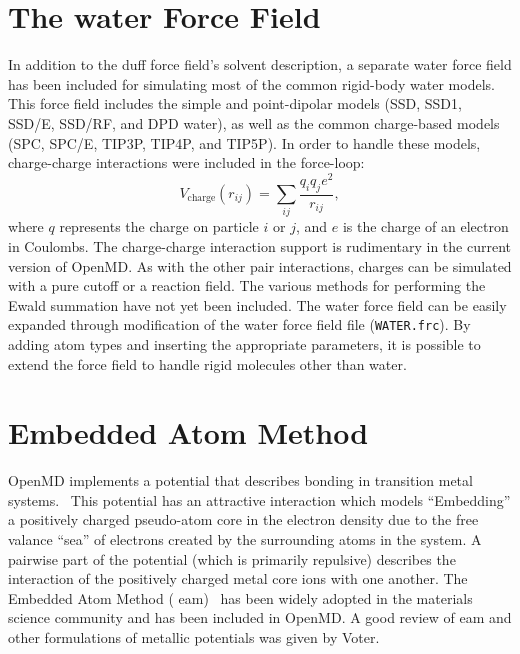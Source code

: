 \documentclass[]{book}
\begin{document}
\section{\label{section:WATER}The {\sc water} Force Field}

In addition to the {\sc duff} force field's solvent description, a
separate {\sc water} force field has been included for simulating most
of the common rigid-body water models. This force field includes the
simple and point-dipolar models (SSD, SSD1, SSD/E, SSD/RF, and DPD
water), as well as the common charge-based models (SPC, SPC/E, TIP3P,
TIP4P, and
TIP5P).\cite{liu96:new_model,Ichiye03,fennell04,Marrink01,Berendsen81,Berendsen87,Jorgensen83,Mahoney00}
In order to handle these models, charge-charge interactions were
included in the force-loop:
\begin{equation}
V_{\text{charge}}(r_{ij}) = \sum_{ij}\frac{q_iq_je^2}{r_{ij}}, 
\end{equation}
where $q$ represents the charge on particle $i$ or $j$, and $e$ is the
charge of an electron in Coulombs. The charge-charge interaction
support is rudimentary in the current version of {\sc OpenMD}.  As with
the other pair interactions, charges can be simulated with a pure
cutoff or a reaction field.  The various methods for performing the
Ewald summation have not yet been included.  The {\sc water} force
field can be easily expanded through modification of the {\sc water}
force field file ({\tt WATER.frc}). By adding atom types and inserting
the appropriate parameters, it is possible to extend the force field
to handle rigid molecules other than water.

\section{\label{section:eam}Embedded Atom Method}

{\sc OpenMD} implements a potential that describes bonding in
transition metal
systems.~\cite{Finnis84,Ercolessi88,Chen90,Qi99,Ercolessi02} This
potential has an attractive interaction which models ``Embedding'' a
positively charged pseudo-atom core in the electron density due to the
free valance ``sea'' of electrons created by the surrounding atoms in
the system.  A pairwise part of the potential (which is primarily
repulsive) describes the interaction of the positively charged metal
core ions with one another.  The Embedded Atom Method ({\sc
eam})~\cite{Daw84,FBD86,johnson89,Lu97} has been widely adopted in the
materials science community and has been included in {\sc OpenMD}. A
good review of {\sc eam} and other formulations of metallic potentials
was given by Voter.\cite{Voter:95}
\end{document}
